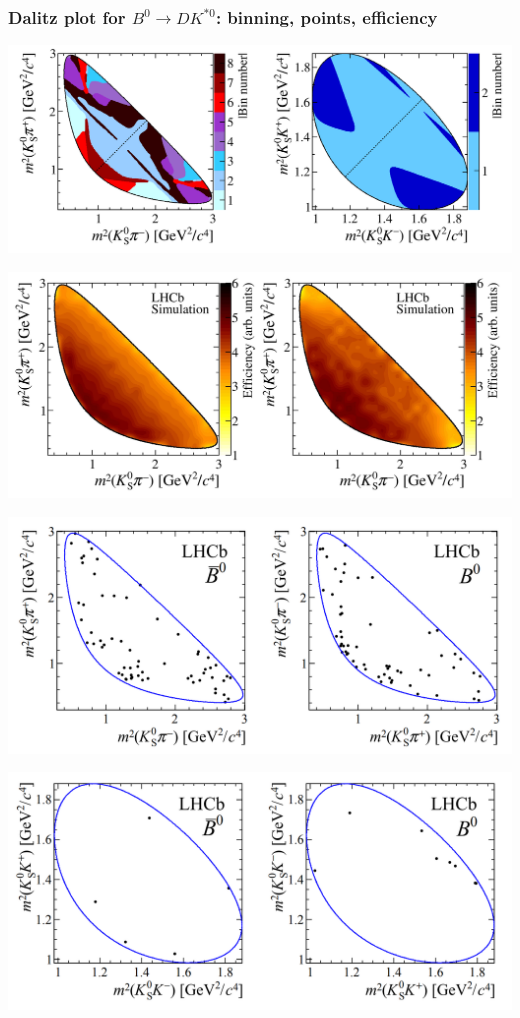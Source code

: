 \documentclass[10pt, aspectratio=169]{beamer}
\def\Kstarz{{K^{*0}}{}}
\begin{document}
\begin{frame}[label=B2DKstar-Dalitz]%
  \frametitle{Dalitz plot for $B^0\to D\Kstarz$: binning, points, efficiency}
  \centering
  \parbox{.45\linewidth}{
    \includegraphics[width=\linewidth]{figures/lect/B2DKstar-Dalitz-binning}
  } \parbox{.45\linewidth}{
    \includegraphics[width=\linewidth]{figures/lect/B2DKstar-eff-Kspipi}
  } \parbox{.45\linewidth}{
    \includegraphics[width=\linewidth]{figures/lect/B2DKstar-Dalitz-Kspipi}
  } \parbox{.45\linewidth}{
    \includegraphics[width=\linewidth]{figures/lect/B2DKstar-Dalitz-KsKK}
  }
\end{frame}%
\end{document}
